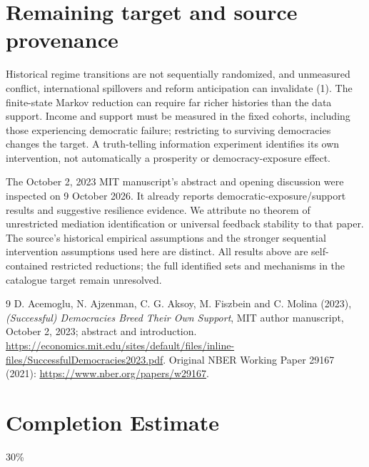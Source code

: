 \documentclass[11pt]{article}
\begin{document}
\section{Remaining target and source provenance}
Historical regime transitions are not sequentially randomized, and
unmeasured conflict, international spillovers and reform anticipation can
invalidate (1). The finite-state Markov reduction can require far richer
histories than the data support. Income and support must be measured in the
fixed cohorts, including those experiencing democratic failure; restricting
to surviving democracies changes the target. A truth-telling information
experiment identifies its own intervention, not automatically a prosperity
or democracy-exposure effect.

The October 2, 2023 MIT manuscript's abstract and opening discussion were
inspected on 9 October 2026. It already reports democratic-exposure/support
results and suggestive resilience evidence. We attribute no theorem of
unrestricted mediation identification or universal feedback stability to
that paper. The source's historical empirical assumptions and the stronger
sequential intervention assumptions used here are distinct. All results
above are self-contained restricted reductions; the full identified sets
and mechanisms in the catalogue target remain unresolved.
\begin{thebibliography}{9}
 D. Acemoglu, N. Ajzenman, C. G. Aksoy, M. Fiszbein and
C. Molina (2023), \emph{(Successful) Democracies Breed Their Own Support},
MIT author manuscript, October 2, 2023; abstract and introduction.
\url{https://economics.mit.edu/sites/default/files/inline-files/SuccessfulDemocracies2023.pdf}.
Original NBER Working Paper 29167 (2021):
\url{https://www.nber.org/papers/w29167}.
\end{thebibliography}

\section{Completion Estimate}
30\%
\end{document}

